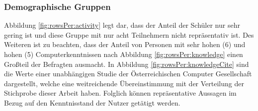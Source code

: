 \documentclass[a4paper]{article}
\begin{document}
            \subsubsection{Demographische Gruppen}
                Abbildung \ref{fig:rowsPer:activity} legt dar, dass der Anteil der Schüler nur sehr gering ist und diese Gruppe mit nur acht Teilnehmern nicht repräsentativ ist. Des Weiteren ist zu beachten, dass der Anteil von Personen mit sehr hohen (6) und hohen (5) Computerkenntnissen nach Abbildung \ref{fig:rowsPer:knowledge} einen Großteil der Befragten ausmacht. In Abbildung \ref{fig:rowsPer:knowledgeCite} sind die Werte einer unabhängigen Studie der Österreichischen Computer Gesellschaft\cite{demographicDistributionKnowledge} dargestellt, welche eine weitreichende Übereinstimmung mit der Verteilung der Stichprobe dieser Arbeit haben. Folglich können repräsentative Aussagen im Bezug auf den Kenntnisstand der Nutzer getätigt werden.
            
\end{document}

